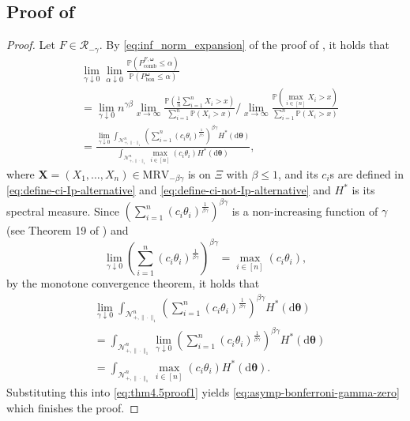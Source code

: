 \documentclass[12pt]{article}
\theoremstyle{plain}
\theoremstyle{plain}
\theoremstyle{definition}
\renewcommand{\Pr}{\mathbb{P}}
\newcommand{\intd}{\mathrm{d}}
\newcommand{\punitsphereone}[1]{\mathcal{N}_{+,\|\cdot\|_1}^{#1}}
\begin{document}
\subsection{Proof of }
\label{subsec:proof-bonferroni-gamma-zero}
\BonferroniGammaZero*
\begin{proof}
Let $F\in\mathscr{R}_{-\gamma}$. By \eqref{eq:inf_norm_expansion} of the proof of , it holds that
\begin{equation}
\label{eq:thm4.5proof1}
\begin{split}
&\lim_{\gamma\downarrow0}\lim_{\alpha\downarrow0} \frac{\Pr\left(P_\mathrm{comb}^{F, \bm \omega}\leq \alpha\right)}{\Pr\left(P_{\mathrm{bon}}^{\bm{\omega}}\leq \alpha\right)}\\
&=\lim_{\gamma\downarrow0}n^{\gamma\beta}\lim_{x\to\infty}\frac{\Pr(\frac{1}{n}\sum_{i=1}^n {X}_i>x)}{\sum_{i=1}^n\Pr({X}_i>x)}\bigg/\lim_{x\to\infty}\frac{\Pr(\max_{i\in[n]}{X}_i>x)}{\sum_{i=1}^n\Pr({X}_i>x)}\\
&=\frac{\lim_{\gamma\downarrow0}\int_{\punitsphereone{n}}\left(\sum_{i=1}^n(c_i\theta_i)^{\frac{1}{\beta\gamma}} \right)^{\beta\gamma} H^*(\intd\bm{\theta})}{\int_{\punitsphereone{n}} \max_{i\in[n]}(c_i\theta_i)H^*(\intd\bm{\theta})},   
\end{split}
\end{equation}
where ${\mathbf{X}}=\left({X}_1,\dots,{X}_n\right)\in\mathrm{MRV}_{-\beta\gamma}$ is on $\Xi$ with $\beta\le1$, and its $c_i$s are defined in \eqref{eq:define-ci-Ip-alternative} and \eqref{eq:define-ci-not-Ip-alternative} and $H^*$ is its spectral measure.
Since $\left(\sum_{i=1}^n(c_i\theta_i)^{\frac{1}{\beta\gamma}} \right)^{\beta\gamma}$ is a non-increasing function of $\gamma$ (see Theorem 19 of ) and  
\[
\lim_{\gamma\downarrow0}\left(\sum_{i=1}^n(c_i\theta_i)^{\frac{1}{\beta\gamma}} \right)^{\beta\gamma}
=\max_{i\in[n]}\left(c_i\theta_i\right),
\]
by the monotone convergence theorem, it holds that
\begin{align*}
&\lim_{\gamma\downarrow0}\int_{\punitsphereone{n}}\left(\sum_{i=1}^n(c_i\theta_i)^{\frac{1}{\beta\gamma}} \right)^{\beta\gamma} H^*(\intd\bm{\theta})\\
&=\int_{\punitsphereone{n}}\lim_{\gamma\downarrow0}\left(\sum_{i=1}^n(c_i\theta_i)^{\frac{1}{\beta\gamma}} \right)^{\beta\gamma} H^*(\intd\bm{\theta})\\
&=\int_{\punitsphereone{n}}\max_{i\in[n]}(c_i\theta_i) H^*(\intd\bm{\theta}).
\end{align*}
Substituting this into \eqref{eq:thm4.5proof1} yields \eqref{eq:asymp-bonferroni-gamma-zero} 
which finishes the proof.
\end{proof}
\end{document}
